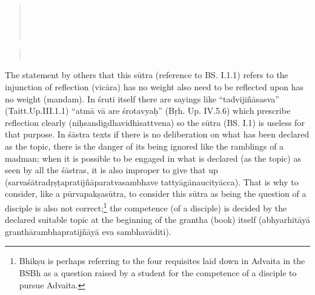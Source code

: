\begin{verse}
\\
\\
\\
\end{verse}
\begin{verse}
\\
\end{verse}

The statement by others that this sūtra (reference to BS. I.1.1) refers to the injunction of reflection  (vicāra) has no weight also need to be reflected upon has no weight (mandam). In śruti itself there are sayings like “tadvijiñāsasva” (Taitt.Up.III.1.1) “atmā vā are śrotavyaḥ” (Bṛh. Up. IV.5.6) which prescribe reflection clearly (niḥsandigdhavidhisattvena) so the sūtra (BS. I.1) is useless for that purpose. In śāstra texts if there is no deliberation on what has been declared as the topic, there is the danger of its being ignored like the ramblings of a madman; when it is possible to be engaged in what is declared (as the topic) as seen by all the śāstras, it is also improper to give that up (sarvaśātradṛṣṭapratijñāparatvasambhave tattyāgānaucityācca). That is why to consider, like a pūrvapakṣasūtra, to consider this sūtra as being the question of a disciple is also not correct;\footnote{Bhikṣu is perhaps referring to the four requisites laid down in Advaita in the BSBh as a question raised by a student for the competence of a disciple to pursue Advaita.} the competence (of a disciple) is decided by the declared suitable topic at the beginning of the grantha (book) itself (abhyarhitāyā granthārambhapratijñāyā eva sambhavāditi).

